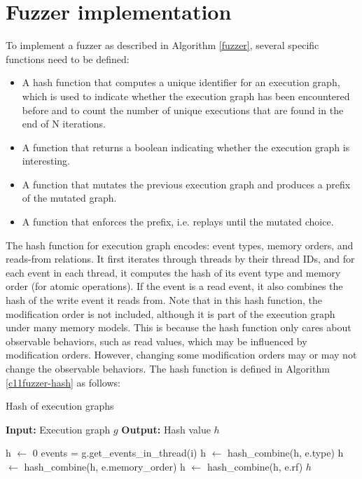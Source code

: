 \section{Fuzzer implementation}\label{c11fuzzer:implementation}

To implement a fuzzer as described in Algorithm \ref{fuzzer}, several specific functions need to be defined:

\begin{itemize}
	\item A hash function that computes a unique identifier for an execution graph, which is used to indicate whether the execution graph has been encountered before and to count the number of unique executions that are found in the end of N iterations.
	\item A function that returns a boolean indicating whether the execution graph is interesting.
	\item A function that mutates the previous execution graph and produces a prefix of the mutated graph.
	\item A function that enforces the prefix, i.e. replays until the mutated choice.
\end{itemize}

The hash function for execution graph encodes: event types, memory orders, and reads-from relations. It first iterates through threads by their thread IDs, and for each event in each thread, it computes the hash of its event type and memory order (for atomic operations). If the event is a read event, it also combines the hash of the write event it reads from. Note that in this hash function, the modification order is not included, although it is part of the execution graph under many memory models. This is because the hash function only cares about observable behaviors, such as read values, which may be influenced by modification orders. However, changing some modification orders may or may not change the observable behaviors. The hash function is defined in Algorithm \ref{c11fuzzer-hash} as follows:


\begin{algorithm}
	\caption{Hash of execution graphs}
	\label{c11fuzzer-hash}
	\begin{algorithmic}[1]
		\STATE \textbf{Input:} Execution graph $g$
		\STATE \textbf{Output:} Hash value $h$

		\STATE h $\leftarrow$ 0
		\STATE events = g.get\_events\_in\_thread(i)
		\STATE h $\leftarrow$ hash\_combine(h, e.type)
		\STATE h $\leftarrow$ hash\_combine(h, e.memory\_order)
		\STATE h $\leftarrow$ hash\_combine(h, e.rf)
		\ENDIF
		\ENDFOR
		\ENDFOR
		\RETURN $h$
	\end{algorithmic}
\end{algorithm}


